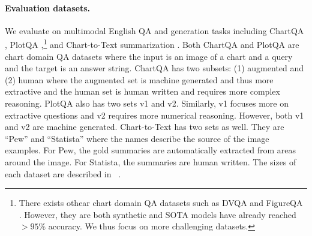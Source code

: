 \begin{table}[t!]
    \small
    \centering
    \caption{Statistics of the finetuning datasets.}
    \vspace{-0.5em}
    \label{tab:finetune_data}
\end{table}

\paragraph{Evaluation datasets.} We evaluate \model{} on multimodal English QA and generation tasks including ChartQA \citep{masry-etal-2022-chartqa}, PlotQA \citep{methani2020plotqa},\footnote{There exists othear chart domain QA datasets such as DVQA \citep{kafle2018dvqa} and FigureQA \citep{kahou2017figureqa}. However, they are both synthetic and SOTA models have already reached $>95\%$ accuracy. We thus focus on more challenging datasets.} and Chart-to-Text summarization \citep{kantharaj-etal-2022-chart}. Both ChartQA and PlotQA are chart domain QA datasets where the input is an image of a chart and a query and the target is an answer string. ChartQA has two subsets: (1) augmented and (2) human where the augmented set is machine generated and thus more extractive and the human set is human written and requires more complex reasoning. PlotQA also has two sets v1 and v2. Similarly, v1 focuses more on extractive questions and v2 requires more numerical reasoning. However, both v1 and v2 are machine generated. Chart-to-Text has two sets as well. They are ``Pew'' and ``Statista'' where the names describe the source of the image examples. For Pew, the gold summaries are automatically extracted from areas around the image. For Statista, the summaries are human written. The sizes of each dataset are described in
~.

